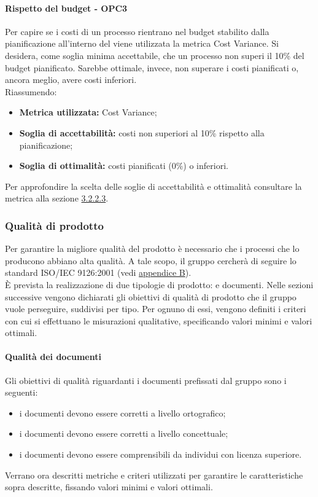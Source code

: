 \documentclass[PianoDiQualifica.tex]{subfiles}
\begin{document}
			\paragraph{Rispetto del budget - OPC3}
			Per capire se i costi di un processo rientrano nel budget stabilito dalla pianificazione all'interno del \PPdoc{} viene utilizzata la metrica Cost Variance.
			Si desidera, come soglia minima accettabile, che un processo non superi il 10\% del budget pianificato. Sarebbe ottimale, invece, non superare i costi pianificati o, ancora meglio, avere costi inferiori.\\
			Riassumendo:
			\begin{itemize}
			\item \textbf{Metrica utilizzata:} Cost Variance;
			\item \textbf{Soglia di accettabilità:} costi non superiori al 10\% rispetto alla pianificazione;
			\item \textbf{Soglia di ottimalità:}  costi pianificati (0\%) o inferiori.
			\end{itemize}
			Per approfondire la scelta delle soglie di accettabilità e ottimalità consultare la metrica alla sezione \hyperlink{Cost_m}{3.2.2.3}.

		\subsubsection{Qualità di prodotto}
		Per garantire la migliore qualità del prodotto è necessario che i processi che lo producono abbiano alta qualità.
		A tale scopo, il gruppo \GRUPPO{} cercherà di seguire lo standard ISO/IEC 9126:2001 (vedi \hyperlink{ISOIEC}{appendice B}). \\
		È prevista la realizzazione di due tipologie di prodotto:  e documenti.
		Nelle sezioni successive vengono dichiarati gli obiettivi di qualità di prodotto che il gruppo vuole perseguire, suddivisi per tipo.
		Per ognuno di essi, vengono definiti i criteri con cui si effettuano le misurazioni qualitative, specificando valori minimi e valori ottimali.

			\paragraph{Qualità dei documenti}
			Gli obiettivi di qualità riguardanti i documenti prefissati dal gruppo \GRUPPO{} sono i seguenti:
			\begin{itemize}
				\item i documenti devono essere corretti a livello ortografico;
				\item i documenti devono essere corretti a livello concettuale;
				\item i documenti devono essere comprensibili da individui con licenza superiore.
			\end{itemize}
			Verrano ora descritti metriche e criteri utilizzati per garantire le caratteristiche sopra descritte, fissando valori minimi e valori ottimali.
\end{document}
